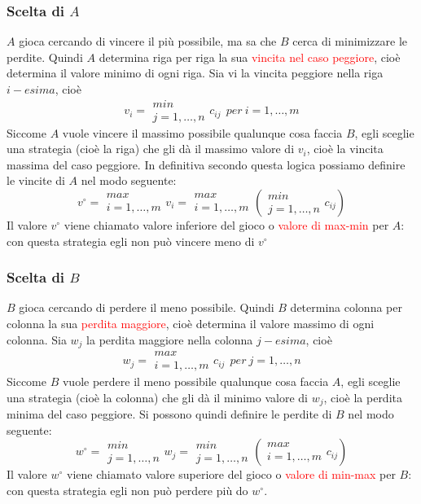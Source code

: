 \documentclass[12pt,a4paper]{article}
\begin{document}
\subsubsection{Scelta di $A$}
$A$ gioca cercando di vincere il più possibile, ma sa che $B$ cerca di minimizzare le perdite. Quindi $A$ determina riga per riga la sua \textcolor{red}{vincita nel caso peggiore}, cioè determina il valore minimo di ogni riga. Sia vi la vincita peggiore nella riga $i-esima$, cioè
$$v_i=\begin{array}{c}min\\j=1,\dots,n\end{array}c_{ij} \ \ per \ i=1,\dots,m$$
Siccome $A$ vuole vincere il massimo possibile qualunque cosa faccia $B$, egli sceglie una strategia (cioè la riga) che gli dà il massimo valore di $v_i$, cioè la vincita massima del caso peggiore. In definitiva secondo questa logica possiamo definire le vincite di $A$ nel modo seguente:
$$v^\circ = \begin{array}{c}max\\i=1,\dots,m\end{array}v_i = \begin{array}{c}max\\i=1,\dots,m\end{array}(\begin{array}{c}min\\j=1,\dots,n\end{array}c_{ij})$$
Il valore $v^\circ$ viene chiamato valore inferiore del gioco o \textcolor{red}{valore di max-min} per $A$: con questa strategia egli non può vincere meno di $v^\circ$

\subsubsection{Scelta di $B$}
$B$ gioca cercando di perdere il meno possibile. Quindi $B$ determina colonna
per colonna la sua \textcolor{red}{perdita maggiore}, cioè determina il valore massimo di
ogni colonna. Sia $w_j$ la perdita maggiore nella colonna $j-esima$, cioè
$$w_j = \begin{array}{c}max\\i=1,\dots,m\end{array}c_{ij} \ \ per \ j=1, \dots, n$$
Siccome $B$ vuole perdere il meno possibile qualunque cosa faccia $A$, egli sceglie una strategia (cioè la colonna) che gli dà il minimo valore di $w_j$, cioè la perdita minima del caso peggiore. Si possono quindi definire le perdite di $B$ nel modo seguente:
$$w^\circ = \begin{array}{c}min\\j=1,\dots,n\end{array}w_j = \begin{array}{c}min\\j=1,\dots,n\end{array}(\begin{array}{c}max\\i=1,\dots,m\end{array}c_{ij})$$
Il valore $w^\circ$ viene chiamato valore superiore del gioco o \textcolor{red}{valore di min-max} per $B$: con questa strategia egli non può perdere più do $w^\circ$.
\end{document}
